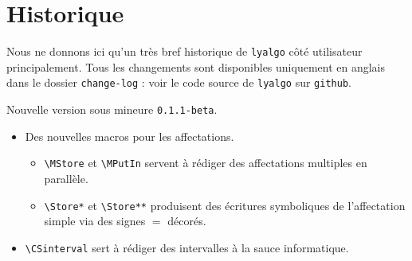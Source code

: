 \documentclass[12pt,a4paper]{article}
\begin{document}
\newpage
\section{Historique}

Nous ne donnons ici qu'un très bref historique de \verb+lyalgo+ côté utilisateur principalement.
Tous les changements sont disponibles uniquement en anglais dans le dossier \verb+change-log+ : voir le code source de \verb+lyalgo+ sur \verb+github+.

\begin{description}[leftmargin=1em]
    \setlength\itemsep{1em}



%
%
%
%
%
%
%
%
%



    \item[2019-10-21] Nouvelle version sous mineure \verb+0.1.1-beta+.
    \begin{itemize}
        \item Des nouvelles macros pour les affectations.
        \begin{itemize}
        	\item \verb+\MStore+ et \verb+\MPutIn+ servent à rédiger des affectations multiples en parallèle.

        	\item \verb+\Store*+ et \verb+\Store**+ produisent des écritures symboliques de l'affectation simple via des signes $=$ décorés.
        \end{itemize}

        \item \verb+\CSinterval+ sert à rédiger des intervalles à la sauce informatique.
    \end{itemize}



\end{description}
\end{document}
